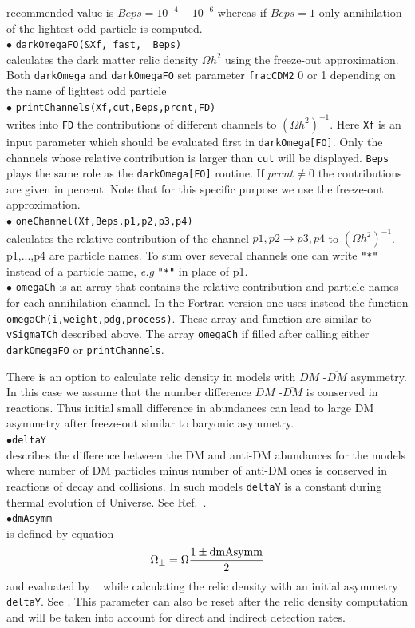 \documentclass[12pt,a4paper]{article}
\begin{document}
recommended value is $Beps=10^{-4} - 10^{-6}$ whereas 
if $Beps=1$ only annihilation of the
lightest odd particle is computed.\\
\noindent
$\bullet$ \verb|darkOmegaFO(&Xf, fast,  Beps)|\\
calculates the  dark matter relic density $\Omega h^2$ using the freeze-out approximation.
Both \verb|darkOmega| and \verb|darkOmegaFO| set parameter {\tt fracCDM2} 0 or 1 depending 
on the name of lightest odd particle \\
\noindent
$\bullet$ \verb|printChannels(Xf,cut,Beps,prcnt,FD)|\\   
writes into \verb|FD| the  contributions  of different channels to $(\Omega
h^2)^{-1}$. Here \verb|Xf| is an input parameter which should
be  evaluated first in \verb|darkOmega[FO]|. Only  the channels whose
relative contribution is larger than  \verb|cut| will be displayed. \verb|Beps|
plays the same role as the \verb|darkOmega[FO]| routine.
If $prcnt\ne 0$ the contributions are given in percent.
Note that  for this specific purpose  we use the
freeze-out approximation.\\
$\bullet$ \verb|oneChannel(Xf,Beps,p1,p2,p3,p4)|\\   
calculates the relative   contribution of the  channel $ p1,p2 \to p3,p4$
to $(\Omega h^2)^{-1}$. p1,...,p4 are particle names.  To 
sum over several channels one can write  \verb|"*"| instead 
of  a particle name, {\it e.g} \verb|"*"| in place of p1.\\
\noindent
$\bullet$ \verb|omegaCh| is an array that contains the relative contribution and particle names for each
annihilation channel. In the Fortran version one uses instead
the function\\
\noindent\verb|omegaCh(i,weight,pdg,process)|. These array and function
are similar to {\tt vSigmaTCh} described above. The array {\tt omegaCh} if filled after calling either
{\tt darkOmegaFO} or {\tt printChannels}. 

There is an option to calculate relic density in  models with  $DM$ -$\overline{DM}$ asymmetry.  
In this case we assume that the  number difference   $DM$ -$\overline{DM}$ is conserved in reactions.
Thus initial  small difference in abundances can lead to large DM asymmetry after freeze-out similar to baryonic
asymmetry.\\ 
\noindent
$\bullet$\verb|deltaY|\\
describes the difference between the DM and anti-DM abundances for the
models where number of DM particles minus number of anti-DM ones is conserved in
reactions of decay and collisions. In such models \verb|deltaY| is a
constant during thermal evolution of Universe.  See Ref.~\cite{Belanger:2013oya}.\\
\noindent
$\bullet$\verb|dmAsymm|\\
is defined by equation 
$$ \Omega_{\pm} = \Omega \frac{1 \pm {\rm dmAsymm}}{2}$$
and evaluated  by \micro~ while calculating the relic density  with an
initial asymmetry \verb|deltaY|. See \cite{Belanger:2013oya}. 
This parameter can also be reset  after the relic density 
computation and will be taken into account for direct and 
indirect detection rates.
\end{document}
